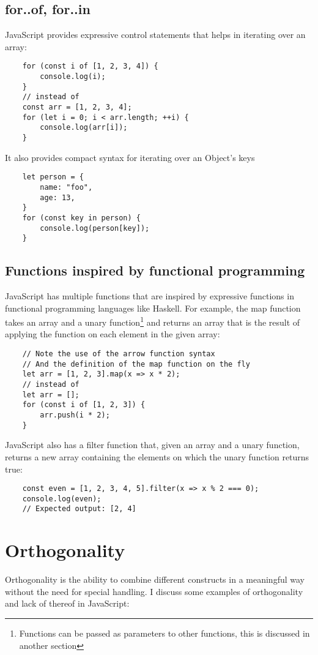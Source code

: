 \documentclass[11pt,a4paper]{article}
\begin{document}
\subsection{\label{for_of_for_in}for..of, for..in}
JavaScript provides expressive control statements that helps in iterating over an array:
\begin{verbatim}
    for (const i of [1, 2, 3, 4]) {
        console.log(i);
    }
    // instead of
    const arr = [1, 2, 3, 4];
    for (let i = 0; i < arr.length; ++i) {
        console.log(arr[i]);
    }
\end{verbatim}
It also provides compact syntax for iterating over an Object's keys
\begin{verbatim}
    let person = {
        name: "foo",
        age: 13,
    }
    for (const key in person) {
        console.log(person[key]);
    }
\end{verbatim}

\subsection{\label{fp_functions}Functions inspired by functional programming}
JavaScript has multiple functions that are inspired by expressive functions in functional programming languages like
Haskell.
For example, the map function takes an array and a unary
function\footnote{Functions can be passed as parameters to other functions, this is discussed in another section}
and returns an array that is the result of applying the function on each element in the given array:
\begin{verbatim}
    // Note the use of the arrow function syntax
    // And the definition of the map function on the fly
    let arr = [1, 2, 3].map(x => x * 2);
    // instead of
    let arr = [];
    for (const i of [1, 2, 3]) {
        arr.push(i * 2);
    }
\end{verbatim}
JavaScript also has a filter function that, given an array and a unary function,
returns a new array containing the elements on which the unary function returns true:
\begin{verbatim}
    const even = [1, 2, 3, 4, 5].filter(x => x % 2 === 0);
    console.log(even);
    // Expected output: [2, 4]
\end{verbatim}

\section{Orthogonality}
Orthogonality is the ability to combine different constructs in a meaningful way without the need for special handling.
I discuss some examples of orthogonality and lack of thereof in JavaScript:
\end{document}
